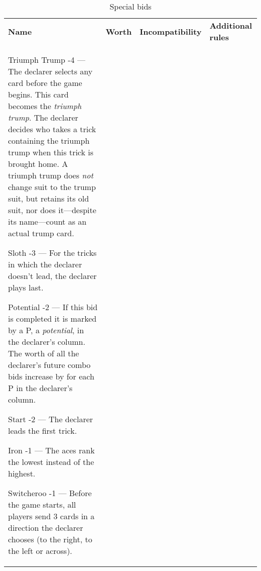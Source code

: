 %
%
%
%

\begin{table}
	\caption{Special bids}\label{tab:specialBids}
	\begin{center}
		\begin{tabularx}{\textwidth}{
			l
			S[table-number-alignment=center, table-figures-decimal=0]
			p{3cm}
			|X
		}
			\textbf{Name} &
			\textbf{Worth} &
			\textbf{Incompatibility} &
			\textbf{Additional rules}
			\\[-3ex]

			\specialBidItem%
			{Triumph Trump}
			{-4}
			{---}
			{%
				The declarer selects any card before the game begins. This card becomes the \emph{triumph trump}. The declarer decides who takes a trick containing the triumph trump when this trick is brought home. A triumph trump does \emph{not} change suit to the trump suit, but retains its old suit, nor does it---despite its name---count as an actual trump card.
			}

			\specialBidItem%
			{Sloth}
			{-3}
			{---}
			{%
				For the tricks in which the declarer doesn't lead, the declarer plays last.
			}

			\specialBidItem%
			{Potential}
			{-2}
			{---}
			{%
				If this bid is completed it is marked by a P, a \emph{potential}, in the declarer's column. The worth of all the declarer's future combo bids increase by  for each P in the declarer's column.
			}

			\specialBidItem%
			{Start}
			{-2}
			{---}
			{%
				The declarer leads the first trick.
			}

			\specialBidItem%
			{Iron}
			{-1}
			{---}
			{%
				The aces rank the lowest instead of the highest.
			}

			\specialBidItem%
			{Switcheroo}
			{-1}
			{---}
			{%
				Before the game starts, all players send 3 cards in a direction the declarer chooses (to the right, to the left or across).
			}


\end{tabularx}
\end{center}
\end{table}
